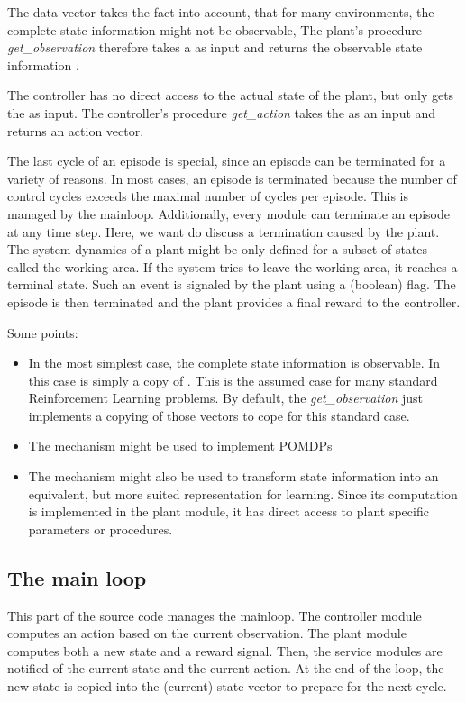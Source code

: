 \documentclass[a4paper,12pt,german]{article}
\newcommand{\ite}{\begin{itemize}}
\newcommand{\eti}{\end{itemize}}
\begin{document}
The data vector \observedstate takes the fact into account, that for
many environments, the complete state information might not be observable,
The plant's procedure {\em get\_observation} therefore takes a \plantstate  as input and 
returns the observable state information \observedstate.

The controller has no direct access to the actual state of the plant, but only gets the 
\observedstate as input. The controller's procedure {\em get\_action} takes the \observedstate as 
an input and returns an action vector.

The last cycle of an episode is special, since an episode can be terminated for a variety of 
reasons. In most cases, an episode is terminated because the number of control cycles exceeds the 
maximal number of cycles per episode. This is managed by the mainloop. Additionally, every module can terminate
an episode at any time step. Here, we want do discuss a termination caused by the plant. The system dynamics of a 
plant might be only defined for a subset of states called the working area. If the system tries to leave the working 
area, it reaches a terminal state. Such an event is signaled by the plant using a (boolean) flag. The episode is then 
terminated and the plant provides a final reward to the controller.


Some points:

\ite
\item In the most simplest case, the complete state information is observable.
In this case \observedstate is simply a copy of \plantstate. This is the assumed case
for many standard Reinforcement Learning problems. By default, the 
{\em get\_observation} just implements a copying of those vectors
to cope for this standard case.
\item The \observedstate mechanism might be used to implement POMDPs
\item The \observedstate mechanism might also be used to transform state information into
an equivalent, but more suited representation for learning. Since its computation is implemented
in the plant module, it has direct access to plant specific parameters or procedures.
\eti


\subsection{The main loop}

This part of the source code manages the mainloop. The controller module computes an action based
on the current observation. The plant module computes
both a new state and a reward signal. Then, the service modules are notified of the current 
state and the current action. At the end of the loop, the new state is copied into the (current) state 
vector to prepare for the next cycle.
\end{document}
